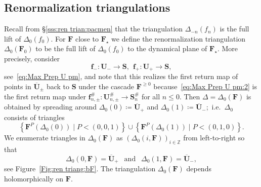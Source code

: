 \documentclass{amsart}
\renewcommand{\sp}{{\ \ }}
\newcommand{\1}{{\mathbb 1 }}
\newcommand{\bDelta}{{\mathbb{\Delta}}}
\newcommand{\bF}{{\mathbf F}}
\newcommand{\bS}{{\mathbf S}}
\newcommand{\bU}{{\mathbf U}}
\newcommand{\bbf}{{\mathbf f}}
\newcommand{\str}{{\star}}
\newcommand{\Z}{\mathbb{Z}}
\theoremstyle{remark}
\numberwithin{equation}{section}
\theoremstyle{definition}
\theoremstyle{nonumberbreak}
\begin{document}
\subsection{Renormalization triangulations}
\label{ss:RenTriang}
Recall from \S\ref{sss:ren trian:pacmen} that the triangulation $\bDelta_{-n}(f_n)$ is the full lift of $\bDelta_0(f_0)$. For $\bF$ close to $\bF_\str$ we define the renormalization triangulation $\bDelta_0(\bF_0)$ to be the full lift of $\bDelta_0(f_0)$ to the dynamical plane of $\bF_\str$. More precisely, consider
\begin{equation}
\label{eq:Max Prep U pm:2}
\bbf_-\colon \bU_-\to \bS,\sp \bbf_+\colon \bU_+\to \bS,
\end{equation}
see~\eqref{eq:Max Prep U pm}, and note that this realizes the first return map of points in $\overline \bU_\pm$ back to $\bS$ under the cascade $\bF^{\ge0}$ because~\eqref{eq:Max Prep U pm:2} is the first return map under $\bbf^{\#}_{n,\pm }\colon \bU^\#_{n,\pm}\to \bS^\#_n$ for all $n\le 0$. Then $\bDelta=\bDelta_0(\bF)$ is obtained by spreading around $\Delta_0(0)\coloneqq \overline \bU_+$ and $\Delta_0(1)\coloneqq \overline \bU_-$;~i.e.~$\bDelta_0$ consists of triangles \[ 
\left\{\bF^P(\Delta_0(0))\mid P< (0,0,1) \right\} \cup
\left\{\bF^P(\Delta_0(1))\mid P< (0,1,0) \right\}.
\] We enumerate triangles in $\bDelta_0(\bF)$ as $(\Delta_0(i,\bF))_{i\in \Z}$ from left-to-right so that 
\[\Delta_0(0,\bF)=\overline \bU_+\sp\text{ and }\sp \Delta_0(1,\bF)= \overline\bU_-,\]
see Figure~\ref{Fig:ren triang:bF}. The triangulation $\bDelta_0(\bF)$ depends holomorphically on $\bF$.
 
\end{document}
